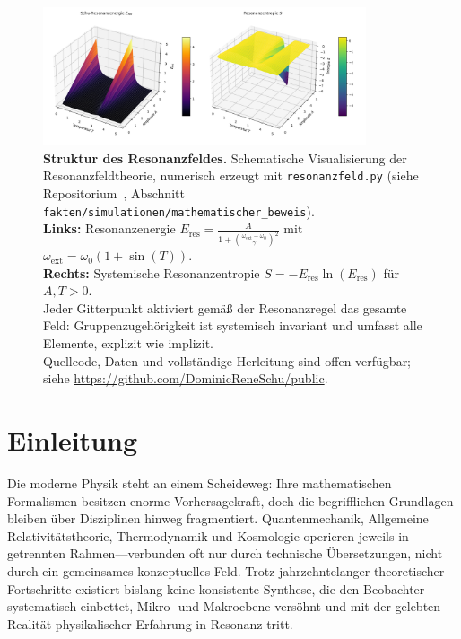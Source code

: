 \documentclass[12pt]{article}
\begin{document}
	\begin{figure}[ht]
		\centering
		\includegraphics[width=0.85\textwidth]{figures/plot.png}
		\caption{
			\textbf{Struktur des Resonanzfeldes.}
			Schematische Visualisierung der Resonanzfeldtheorie, numerisch erzeugt mit \texttt{resonanzfeld.py} (siehe Repositorium~\cite{rftrepo}, Abschnitt \texttt{fakten/simulationen/mathematischer\_beweis}).\\
			\textbf{Links:} Resonanzenergie $E_{\mathrm{res}} = \frac{A}{1 + \left(\frac{\omega_\mathrm{ext} - \omega_0}{\gamma}\right)^2}$ mit $\omega_\mathrm{ext} = \omega_0 (1 + \sin(T))$.\\
			\textbf{Rechts:} Systemische Resonanzentropie $S = -E_{\mathrm{res}}\ln(E_{\mathrm{res}})$ für $A, T > 0$.\\
			Jeder Gitterpunkt aktiviert gemäß der Resonanzregel das gesamte Feld: Gruppenzugehörigkeit ist systemisch invariant und umfasst alle Elemente, explizit wie implizit.\\
			Quellcode, Daten und vollständige Herleitung sind offen verfügbar; siehe \url{https://github.com/DominicReneSchu/public}.
		}
		\label{fig:resonance_field_plot}
	\end{figure}
	
\section{Einleitung}

Die moderne Physik steht an einem Scheideweg: Ihre mathematischen Formalismen besitzen enorme Vorhersagekraft, doch die begrifflichen Grundlagen bleiben über Disziplinen hinweg fragmentiert. Quantenmechanik, Allgemeine Relativitätstheorie, Thermodynamik und Kosmologie operieren jeweils in getrennten Rahmen—verbunden oft nur durch technische Übersetzungen, nicht durch ein gemeinsames konzeptuelles Feld. Trotz jahrzehntelanger theoretischer Fortschritte existiert bislang keine konsistente Synthese, die den Beobachter systematisch einbettet, Mikro- und Makroebene versöhnt und mit der gelebten Realität physikalischer Erfahrung in Resonanz tritt.
\end{document}
